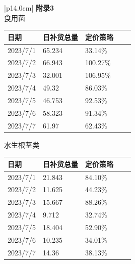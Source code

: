 \documentclass{my_paper}
\begin{document}
\begin{table}[H]
    \centering
    \begin{tabular}{|p{14.0cm}|}
    \hline
    \textbf{附录3} \\ 
    \hline
食用菌
\begin{table}[H]
\begin{tabular}{lllll}
\toprule
日期       & 日补货总量  & 定价策略     &  &  \\
\midrule
2023/7/1 & 65.234 & 33.14\%  &  &  \\
2023/7/2 & 66.943 & 100.27\% &  &  \\
2023/7/3 & 32.001 & 106.95\% &  &  \\
2023/7/4 & 49.32  & 86.03\%  &  &  \\
2023/7/5 & 46.753 & 92.53\%  &  &  \\
2023/7/6 & 58.323 & 91.34\%  &  &  \\
2023/7/7 & 61.97  & 62.43\%  &  & \\
\bottomrule
\end{tabular}
\end{table}

水生根茎类
\begin{table}[]
\begin{tabular}{lllll}
日期       & 日补货总量  & 定价策略    &  &  \\
\midrule
2023/7/1 & 21.843 & 84.10\% &  &  \\
2023/7/2 & 11.625 & 44.23\% &  &  \\
2023/7/3 & 15.667 & 88.26\% &  &  \\
2023/7/4 & 9.712  & 32.74\% &  &  \\
2023/7/5 & 18.404 & 52.90\% &  &  \\
2023/7/6 & 10.235 & 34.01\% &  &  \\
2023/7/7 & 14.36  & 38.13\% &  & \\
\bottomrule
\end{tabular}
\end{table}



    \\
    \\
\hline
    \end{tabular}
\end{table}\newpage
\end{document}
